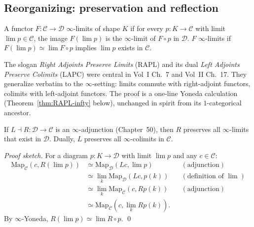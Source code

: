 \subsection{Reorganizing: preservation and reflection}

\begin{definition}
\label{def:limit-preservation}
A functor $F : \mathcal{C} \to \mathcal{D}$  $\infty$-limits
of shape $K$ if for every $p : K \to \mathcal{C}$ with limit
$\lim p \in \mathcal{C}$, the image $F(\lim p)$ is the $\infty$-limit of
$F \circ p$ in $\mathcal{D}$. $F$  $\infty$-limits if
$F(\lim p) \simeq \lim F \circ p$ implies $\lim p$ exists in $\mathcal{C}$.
\end{definition}

\begin{readernote}
The slogan \emph{Right Adjoints Preserve Limits} (RAPL) and its dual
\emph{Left Adjoints Preserve Colimits} (LAPC) were central in Vol~I
Ch.~7 and Vol~II Ch.~17. They generalize verbatim to the
$\infty$-setting: limits commute with right-adjoint functors, colimits
with left-adjoint functors. The proof is a one-line Yoneda calculation
(Theorem~\ref{thm:RAPL-infty} below), unchanged in spirit from its
$1$-categorical ancestor.
\end{readernote}

\begin{theorem}
\label{thm:RAPL-infty}
If $L \dashv R : \mathcal{D} \to \mathcal{C}$ is an $\infty$-adjunction
(Chapter~50), then $R$ preserves all $\infty$-limits that exist in
$\mathcal{D}$. Dually, $L$ preserves all $\infty$-colimits in $\mathcal{C}$.
\end{theorem}

\begin{proof}[Proof sketch]
For a diagram $p : K \to \mathcal{D}$ with limit $\lim p$ and any $c \in
\mathcal{C}$:
\begin{align*}
  \mathrm{Map}_\mathcal{C}(c, R(\lim p)) &\simeq \mathrm{Map}_\mathcal{D}(L c, \lim p) && (\text{adjunction}) \\
  &\simeq \lim_k \mathrm{Map}_\mathcal{D}(L c, p(k)) && (\text{definition of } \lim) \\
  &\simeq \lim_k \mathrm{Map}_\mathcal{C}(c, R p(k)) && (\text{adjunction}) \\
  &\simeq \mathrm{Map}_\mathcal{C}(c, \lim_k R p(k)).
\end{align*}
By $\infty$-Yoneda, $R(\lim p) \simeq \lim R \circ p$. \qed
\end{proof}


